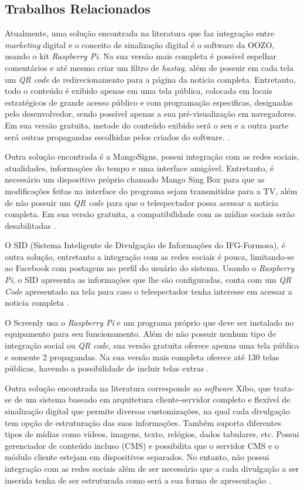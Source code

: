 \documentclass[
	12pt,				%
	openright,			%
	oneside,			%
	a4paper,			%
	english,			%
	french,				%
	spanish,			%
	brazil,				%
	]{abntex2}
\begin{document}
	\subsection*{Trabalhos Relacionados}
	Atualmente, uma solução encontrada na literatura que faz integração entre \textit{marketing} digital e o conceito de sinalização digital é o software da OOZO, usando o kit \textit{Raspberry Pi}. Na sua versão mais completa é possível espelhar comentários e até mesmo criar um filtro de \textit{hastag}, além de possuir em cada tela um \textit{QR code} de redirecionamento para a página da noticia completa. Entretanto, todo o conteúdo é exibido apenas em uma tela pública, colocada em locais estratégicos de grande acesso público e com programação especificas, designadas pelo desenvolvedor, sendo possível apenas a sua pré-visualização em navegadores. Em sua versão gratuita, metade do conteúdo exibido será o seu e a outra parte será outras propagandas escolhidas pelos criados do software. \cite{oozo2017}.

	Outra solução encontrada é a MangoSigns, possui integração com as redes sociais, atualidades, informações do tempo e uma interface amigável. Entretanto, é necessário um dispositivo próprio chamado Mango Sing Box para que as modificações feitas na interface do programa sejam transmitidas para a TV, além de não possuir um \textit{QR code} para que o telespectador possa acessar a noticia completa. Em sua versão gratuita, a compatibilidade com as mídias sociais serão desabilitadas \cite{mango2017}.
	
	O SID (Sistema Inteligente de Divulgação de Informações do IFG-Formosa), é outra solução, entretanto a integração com as redes sociais é pouca, limitando-se ao Facebook com postagens no perfil do usuário do sistema. Usando o \textit{Raspberry Pi}, o SID apresenta as informações que lhe são configuradas, conta com um \textit{QR Code} apresentado na tela para caso o telespectador tenha interesse em acessar a noticia completa \cite{sobrinho2017}.
	
	O Screenly usa o \textit{Raspberry Pi} e um programa próprio que deve ser instalado no equipamento para seu funcionamento. Além de não possuir nenhum tipo de integração social ou \textit{QR code}, sua versão gratuita oferece apenas uma tela pública e somente 2 propagandas. Na sua versão mais completa oferece até 130 telas públicas, havendo a possibilidade de incluir telas extras \cite{screenly2017}.
	
	Outra solução encontrada na literatura corresponde ao \textit{software} Xibo, que trata-se de um sistema baseado em arquitetura cliente-servidor completo e flexível de sinalização digital que permite diversas customizações, na qual cada divulgação tem opção de estruturação das suas informações. Também suporta diferentes tipos de mídias como vídeos, imagens, texto, relógios, dados tabulares, etc. Possui gerenciador de conteúdo incluso (CMS) e possibilita que o servidor CMS e o módulo cliente estejam em dispositivos separados. No entanto, não possui integração com as redes sociais além de ser necessário que a cada divulgação a ser inserida tenha de ser estruturada como será a sua forma de apresentação \cite{xibo2017}.
	
\end{document}
